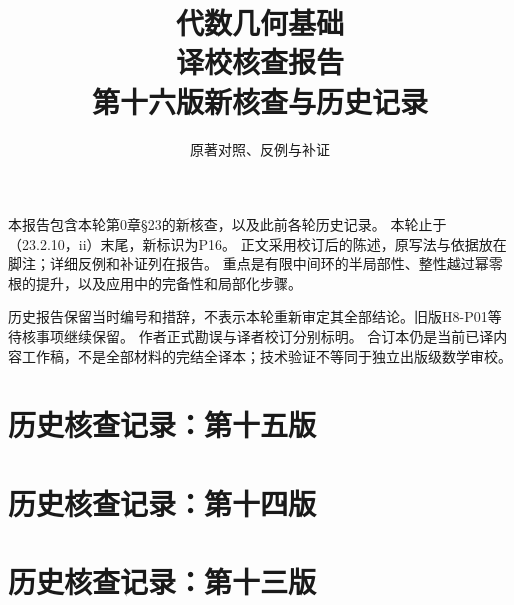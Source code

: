 
\newcommand{\RR}{\mathcal R}
\newcommand{\FF}{\mathcal F}
\newcommand{\GG}{\mathcal G}
\newcommand{\MM}{\mathcal M}
\newcommand{\JJ}{\mathcal J}
\newcommand{\oldauditsrc}[1]{\par\noindent\textbf{原文位置：}#1。\par}
\newcommand{\kind}[2]{\noindent\textbf{分类：#1。}\ #2\par}
\newcommand{\lead}[1]{\par\noindent\textbf{#1}\quad}
\newenvironment{analysisproof}{\par\noindent\textbf{该轮核查的反例或补证。}\ }{\par}

\title{代数几何基础\\译校核查报告\\[1em]\large 第十六版新核查与历史记录}
\author{原著对照、反例与补证}
\date{}

\frontmatter
\maketitle
{}
本报告包含本轮第0章§23的新核查，以及此前各轮历史记录。
本轮止于（23.2.10，ii）末尾，新标识为P16。
正文采用校订后的陈述，原写法与依据放在脚注；详细反例和补证列在报告。
重点是有限中间环的半局部性、整性越过幂零根的提升，以及应用中的完备性和局部化步骤。

历史报告保留当时编号和措辞，不表示本轮重新审定其全部结论。旧版H8-P01等待核事项继续保留。
作者正式勘误与译者校订分别标明。
合订本仍是当前已译内容工作稿，不是全部材料的完结全译本；技术验证不等同于独立出版级数学审校。
\tableofcontents
\mainmatter

\part*{历史核查记录：第十五版}

\part*{历史核查记录：第十四版}

\part*{历史核查记录：第十三版}

